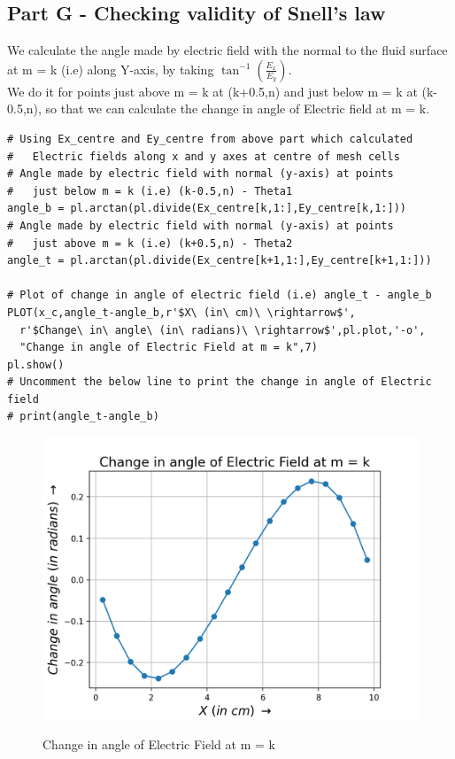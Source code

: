 \documentclass[11pt, a4paper]{article}
\begin{document}
\subsection{Part G - Checking validity of Snell's law}
We calculate the angle made by electric field with the normal to the fluid surface at m = k (i.e) along Y-axis,
by taking $\tan^{-1}(\frac{E_x}{E_y})$.\\
We do it for points just above m = k at (k+0.5,n) and just below m = k at (k-0.5,n),
so that we can calculate the change in angle of Electric field at m = k.
\begin{verbatim}
# Using Ex_centre and Ey_centre from above part which calculated 
#   Electric fields along x and y axes at centre of mesh cells
# Angle made by electric field with normal (y-axis) at points
#   just below m = k (i.e) (k-0.5,n) - Theta1
angle_b = pl.arctan(pl.divide(Ex_centre[k,1:],Ey_centre[k,1:]))
# Angle made by electric field with normal (y-axis) at points 
#   just above m = k (i.e) (k+0.5,n) - Theta2
angle_t = pl.arctan(pl.divide(Ex_centre[k+1,1:],Ey_centre[k+1,1:]))

# Plot of change in angle of electric field (i.e) angle_t - angle_b
PLOT(x_c,angle_t-angle_b,r'$X\ (in\ cm)\ \rightarrow$',
  r'$Change\ in\ angle\ (in\ radians)\ \rightarrow$',pl.plot,'-o',
  "Change in angle of Electric Field at m = k",7)
pl.show()
# Uncomment the below line to print the change in angle of Electric field
# print(angle_t-angle_b)
\end{verbatim}
\begin{figure}[H]
  \centering
  \includegraphics[scale=0.6]{angle_change.png}
  \label{fig:angle_change}
  \caption{Change in angle of Electric Field at m = k}
\end{figure}
\end{document}
